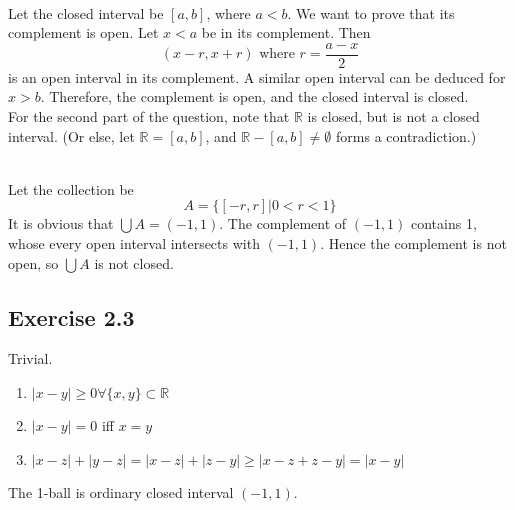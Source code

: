 \begin{solution}
 \\Let the closed interval be $[a,b]$, where $a < b$. We want to prove that its complement is open. Let $x < a$ be in its complement. Then
 $$(x-r,x+r) \text{ where } r = \frac{a-x}{2}$$
 is an open interval in its complement. A similar open interval can be deduced for $x > b$. Therefore, the complement is open, and the closed interval is closed. \\
 For the second part of the question, note that $\mathbb{R}$ is closed, but is not a closed interval. (Or else, let $\mathbb{R} = [a,b]$, and $\mathbb{R}-[a,b] \neq \emptyset$ forms a contradiction.)
\end{solution}


\begin{solution}
 \\Let the collection be
 $$A = \{[-r,r]|0<r<1\}$$
 It is obvious that $\bigcup A = (-1,1)$. The complement of $(-1,1)$ contains 1, whose every open interval intersects with $(-1,1)$. Hence the complement is not open, so $\bigcup A$ is not closed.
\end{solution}

\subsection{Exercise 2.3}


\begin{solution}
Trivial.
\begin{enumerate}
 \item $|x-y| \geq 0 \forall \{x,y\} \subset \mathbb{R}$ \\
 \item $|x-y| = 0$ iff $x=y$ \\
 \item $|x-z|+|y-z|=|x-z|+|z-y| \geq |x-z+z-y| = |x-y|$ \\
 \end{enumerate}
 
 The 1-ball is ordinary closed interval $(-1,1)$.
\end{solution}

